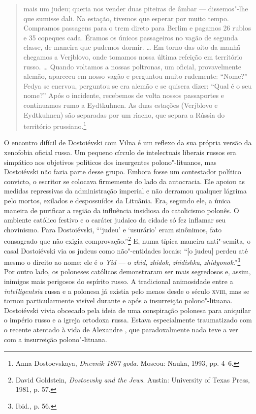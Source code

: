 \begin{quote}
mais um judeu; queria nos vender duas piteiras de âmbar --- dissemos"-lhe
que sumisse dali. Na estação, tivemos que esperar por muito tempo.
Compramos passagens para o trem direto para Berlim e pagamos 26 rublos e
35 copeques cada. Éramos os únicos passageiros no vagão de segunda
classe, de maneira que pudemos dormir. \ldots{} Em torno das oito da
manhã chegamos a Verjblovo, onde tomamos nossa última refeição em
território russo. \ldots{} Quando voltamos a nossas poltronas, um
oficial, provavelmente alemão, apareceu em nosso vagão e perguntou muito
rudemente: ``Nome?'' Fedya se enervou, perguntou se era alemão e se
quisera dizer: ``Qual é o seu nome?'' Após o incidente, recebemos de
volta nossos passaportes e continuamos rumo a Eydtkuhnen. As duas
estações (Verjblovo e Eydtkuhnen) são separadas por um riacho, que
separa a Rússia do território prussiano.\footnote{Anna Dostoevskaya, \textit{Dnevnik 1867 goda}. Moscou: Nauka, 1993, pp. 4--6.} \end{quote}

O encontro difícil de Dostoiévski com Vilna é um reflexo da sua própria
versão da xenofobia oficial russa. Um pequeno círculo de intelectuais
liberais russos era simpático aos objetivos políticos dos insurgentes
polono"-lituanos, mas Dostoiévski não fazia parte desse grupo. Embora
fosse um contestador político convicto, o escritor se colocava
firmemente do lado da autocracia. Ele apoiou as medidas repressivas da
administração imperial e não derramou qualquer lágrima pelo mortos,
exilados e despossuídos da Lituânia. Era, segundo ele, a única maneira
de purificar a região da influência insidiosa do catolicismo polonês. O
ambiente católico festivo e o caráter judaico da cidade só fez inflamar
seu chovinismo. Para Dostoiévski, ```judeu' e `usurário' eram sinônimos,
fato consagrado que não exigia comprovação.''\footnote{David Goldstein, \textit{Dostoevsky and the Jews}. Austin: University of Texas Press, 1981, p. 57.} E, numa típica maneira anti"-semita, o casal Dostoiévski via os judeus como não"-entidades locais: ``{[}o judeu{]} perdeu até
mesmo o direito ao nome; ele é o \textit{Yid} --- o \textit{zhid}, \textit{zhidok},
\textit{zhidishka}, \textit{zhidyonok}.''\footnote{Ibid., p. 56.} Por outro
lado, os poloneses católicos demonstraram ser mais segredosos e, assim,
inimigos mais perigosos do espírito russo. A tradicional animosidade
entre a \textit{intelligentsia} russa e a polonesa já existia pelo menos
desde o século \textsc{xviii}, mas se tornou particularmente visível durante e após
a insurreição polono"-lituana. Dostoiévski vivia obcecado pela ideia de
uma conspiração polonesa para aniquilar o império russo e a igreja
ortodoxa russa. Estava especialmente traumatizado com o recente atentado
à vida de Alexandre , que paradoxalmente nada teve a ver com a
insurreição polono"-lituana.


